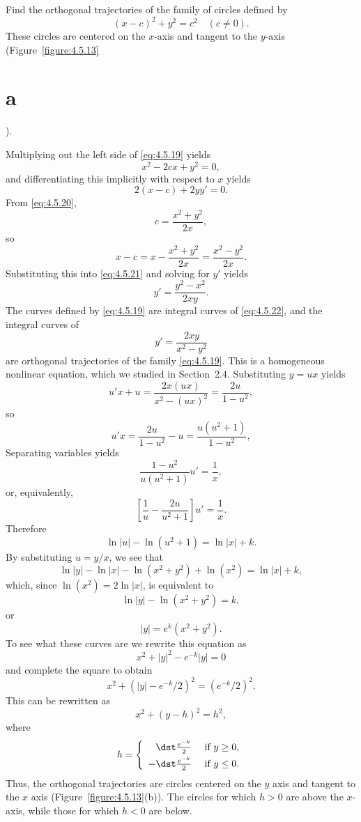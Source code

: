 \setcounter{example}{10}
\setcounter{equation}{18}
\begin{example}
  \rm Find the orthogonal trajectories of the family of circles defined by
  \begin{equation}
    \label{eq:4.5.19}(x-c)^{2}+y^{2}=c^{2}\quad(c\ne0).
  \end{equation}
  These circles are centered on the $x$-axis and tangent to the $y$-axis
  (Figure~\ref{figure:4.5.13}\part{a}).
\end{example}
\setcounter{equation}{19}
\setcounter{figure}{12}
\begin{examplesolution}
\solution Multiplying out the left side of \eqref{eq:4.5.19} yields
\begin{equation}
  \label{eq:4.5.20}x^{2}-2cx+y^{2}=0,
\end{equation}
and differentiating this implicitly with respect to $x$ yields
\begin{equation}
  \label{eq:4.5.21}2(x-c)+2yy'=0.
\end{equation}
From \eqref{eq:4.5.20},
\[
  c=\frac{x^{2}+y^{2}}{2x},
\]
so
\[
  x-c=x-\frac{x^{2}+y^{2}}{2x}=\frac{x^{2}-y^{2}}{2x}.
\]
Substituting this into \eqref{eq:4.5.21} and solving for $y'$ yields
\begin{equation}
  \label{eq:4.5.22}y'=\frac{y^{2}-x^{2}}{2xy}.
\end{equation}
The curves defined by \eqref{eq:4.5.19} are integral curves of \eqref{eq:4.5.22}, and the integral
curves of
\[
  y'=\frac{2xy}{x^{2}-y^{2}}
\]
are orthogonal trajectories of the family \eqref{eq:4.5.19}. This is a homogeneous nonlinear
equation, which we studied in Section~2.4. Substituting $y=ux$ yields
\[
  u'x+u=\frac{2x(ux)}{x^{2}-(ux)^{2}}=\frac{2u}{1-u^{2}},
\]
so
\[
  u'x=\frac{2u}{1-u^{2}}-u=\frac{u(u^{2}+1)}{1-u^{2}},
\]
Separating variables yields
\[
  \frac{1-u^{2}}{u(u^{2}+1)}u'=\frac{1}{x},
\]
or, equivalently,
\[
  \left[\frac{1}{u}-\frac{2u}{u^{2}+1}\right]u'=\frac{1}{x}.
\]
Therefore
\[
  \ln|u|-\ln(u^{2}+1)=\ln|x|+k.
\]
By substituting $u=y/x$, we see that
\[
  \ln|y|-\ln|x|-\ln(x^{2}+y^{2})+\ln(x^{2})=\ln|x|+k,
\]
which, since $\ln(x^{2})=2\ln|x|$, is equivalent to
\[
  \ln|y|-\ln(x^{2}+y^{2})=k,
\]
or
\[
  |y|=e^{k}(x^{2}+y^{2}).
\]
To see what these curves are we rewrite this equation as
\[
  x^{2}+|y|^{2}-e^{-k}|y|=0
\]
and complete the square to obtain
\[
  x^{2}+(|y|-e^{-k}/2)^{2}=(e^{-k}/2)^{2}.
\]
This can be rewritten as
\[
  x^{2}+(y-h)^{2}=h^{2},
\]
where
\[
  h=\left\{
  \begin{array}{rl}
    \dst\frac{e^{-k}}{2}  & \mbox{ if }y\ge 0, \\[\jot]
    -\dst\frac{e^{-k}}{2} & \mbox{ if }y\le0.
  \end{array}\right.
\]
Thus, the orthogonal trajectories are circles centered on the $y$ axis and tangent to the $x$ axis
(Figure~\ref{figure:4.5.13}(b)). The circles for which $h>0$ are above the $x$-axis, while those for
which $h<0$ are below.


\end{examplesolution}
